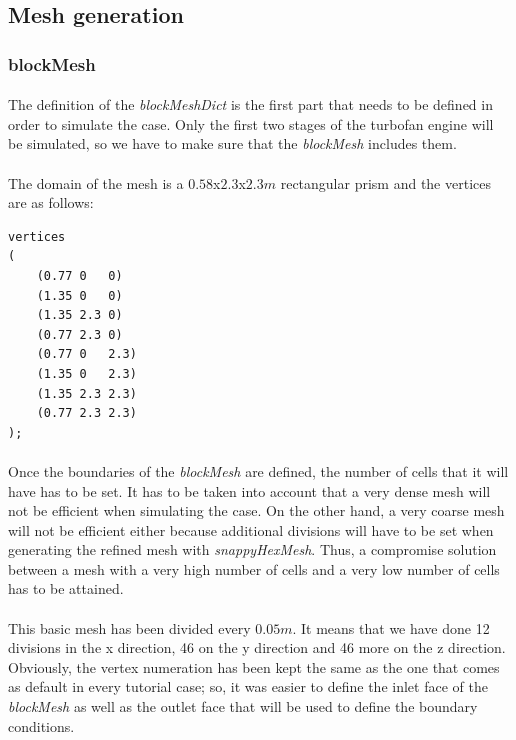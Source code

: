 \subsection{Mesh generation}

\subsubsection{blockMesh}
\paragraph{}The definition of the \textit{blockMeshDict} is the first part that needs to be defined in order to simulate the case. 
Only the first two stages of the turbofan engine will be simulated, so we have to make sure that the \textit{blockMesh} includes them.
\paragraph{}The domain of the mesh is a $0.58$x$2.3$x$2.3m$ rectangular prism and the vertices are as follows:\\
\begin{footnotesize}
\begin{verbatim}
vertices
(
    (0.77 0   0)
    (1.35 0   0)
    (1.35 2.3 0)
    (0.77 2.3 0)
    (0.77 0   2.3)
    (1.35 0   2.3)
    (1.35 2.3 2.3)
    (0.77 2.3 2.3)
);
\end{verbatim}
\end{footnotesize}


\paragraph{}Once the boundaries of the \textit{blockMesh} are defined, the number of cells that it will have has to be set. It has to be taken into account that a very dense mesh will not be efficient when simulating the case. On the other hand, a very coarse mesh will not be efficient either because additional divisions will have to be set when generating the refined mesh with \textit{snappyHexMesh}. Thus, a compromise solution between a mesh with a very high number of cells and a very low number of cells has to be attained.

\paragraph{}This basic mesh has been divided every $0.05m$. It means that we have done 12 divisions in the x direction, 46 on the y direction and 46 more on the z direction. Obviously, the vertex numeration has been kept the same as the one that comes as default in every tutorial case; so, it was easier to define the inlet face of the \textit{blockMesh} as well as the outlet face that will be used to define the boundary conditions.

